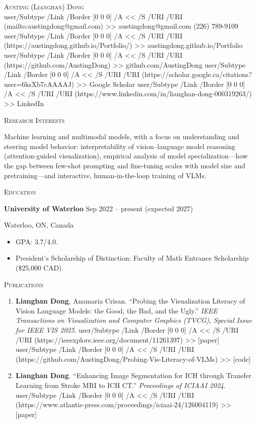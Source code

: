 \documentclass[11pt]{article}
\newcommand{\href}[2]{%
  \leavevmode
  \pdfstartlink user{/Subtype /Link /Border [0 0 0] /A << /S /URI /URI (#1) >>}%
  \textcolor{accent}{#2}%
  \pdfendlink}
\newcommand{\cvsection}[1]{%
  \par\vspace{1em}%
  {\noindent\large\scshape\color{accent}#1\par}%
  \vspace{-0.6em}\noindent{\color{rulegray}\rule{\textwidth}{0.6pt}}\par
  \vspace{0.3em}%
}
\newcommand{\entry}[2]{\noindent\textbf{#1} \hfill {\small\color{mutedgray}#2}\par}
\newcommand{\subentry}[2]{\noindent{\itshape #1} \hfill {\small\color{mutedgray}#2}\par}
\newcommand{\sep}{\;{\color{rulegray}\textbar}\;}
\begin{document}
\begin{center}
  {\Huge\scshape Austing (Lianghan) Dong}\\[0.5em]
  {\small
    \href{mailto:austingdong@gmail.com}{austingdong@gmail.com}\sep
    (226) 789-9109\sep
    \href{https://austingdong.github.io/Portfolio/}{austingdong.github.io/Portfolio}\sep
    \href{https://github.com/AustingDong}{github.com/AustingDong}\sep
    \href{https://scholar.google.ca/citations?user=6ksXb7cAAAAJ}{Google Scholar}\sep
    \href{https://www.linkedin.com/in/lianghan-dong-000319263/}{LinkedIn}
  }
\end{center}

\cvsection{Research Interests}
Machine learning and multimodal models, with a focus on understanding and steering model behavior: interpretability of vision--language model reasoning (attention-guided visualization), empirical analysis of model specialization---how the gap between few-shot prompting and fine-tuning scales with model size and pretraining---and interactive, human-in-the-loop training of VLMs.

\cvsection{Education}
\entry{University of Waterloo}{Sep 2022 -- present (expected 2027)}
\subentry{Bachelor of Computer Science (Co-op)}{Waterloo, ON, Canada}
\begin{itemize}
  \item GPA: 3.7/4.0.
  \item President's Scholarship of Distinction; Faculty of Math Entrance Scholarship (\$25{,}000 CAD).
\end{itemize}

\cvsection{Publications}
\begin{enumerate}
  \item \textbf{Lianghan Dong}, Anamaria Crisan.
        ``Probing the Visualization Literacy of Vision Language Models: the Good, the Bad, and the Ugly.''
        \emph{IEEE Transactions on Visualization and Computer Graphics (TVCG), Special Issue for IEEE VIS 2025}.
        \href{https://ieeexplore.ieee.org/document/11261397}{[paper]}
        \href{https://github.com/AustingDong/Probing-Vis-Literacy-of-VLMs}{[code]}
  \item \textbf{Lianghan Dong}.
        ``Enhancing Image Segmentation for ICH through Transfer Learning from Stroke MRI to ICH CT.''
        \emph{Proceedings of ICIAAI 2024}.
        \href{https://www.atlantis-press.com/proceedings/iciaai-24/126004119}{[paper]}
\end{enumerate}
\end{document}
